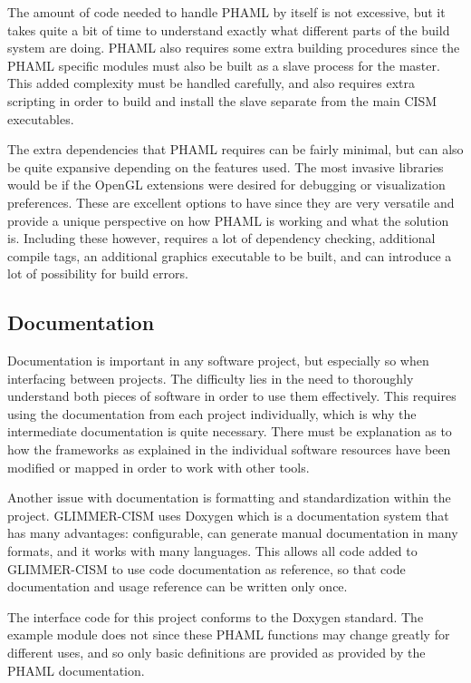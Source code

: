 The amount of code needed to handle PHAML by itself is not excessive, but it takes quite a bit of time to understand exactly what different parts of the build system are doing.  PHAML also requires some extra building procedures since the PHAML specific modules must also be built as a slave process for the master.  This added complexity must be handled carefully, and also requires extra scripting in order to build and install the slave separate from the main CISM executables.

The extra dependencies that PHAML requires can be fairly minimal, but can also be quite expansive depending on the features used.  The most invasive libraries would be if the OpenGL extensions were desired for debugging or visualization preferences.  These are excellent options to have since they are very versatile and provide a unique perspective on how PHAML is working and what the solution is.  Including these however, requires a lot of dependency checking, additional compile tags, an additional graphics executable to be built, and can introduce a lot of possibility for build errors.


\subsection{Documentation}\label{sec:ch4doc}

Documentation is important in any software project, but especially so when interfacing between projects.  The difficulty lies in the need to thoroughly understand both pieces of software in order to use them effectively.  This requires using the documentation from each project individually, which is why the intermediate documentation is quite necessary.  There must be explanation as to how the frameworks as explained in the individual software resources have been modified or mapped in order to work with other tools.

Another issue with documentation is formatting and standardization within the project.  GLIMMER-CISM uses Doxygen which is a documentation system that has many advantages:  configurable, can generate manual documentation in many formats, and it works with many languages.  \citep{doxygen:website} This allows all code added to GLIMMER-CISM to use code documentation as reference, so that code documentation and usage reference can be written only once.

The interface code for this project conforms to the Doxygen standard.  The example module does not since these PHAML functions may change greatly for different uses, and so only basic definitions are provided as provided by the PHAML documentation.
